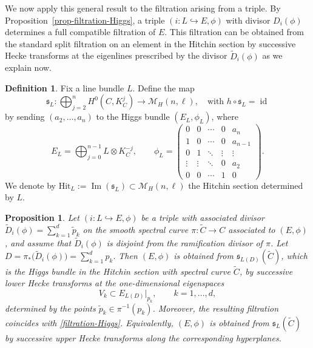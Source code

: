 \documentclass[twoside, 11pt]{article}
\numberwithin{equation}{section}
\theoremstyle{theorem}
\numberwithin{theorem}{section}
\newtheorem{proposition}[proposition]{Proposition}
\theoremstyle{definition}
\newtheorem{definition}[definition]{Definition}
\begin{document}
We now apply this general result to the filtration arising from a triple.
By Proposition~\ref{prop-filtration-Higgs}, a triple
\(
(i:L\hookrightarrow E,\phi)
\)
with divisor \(D_i(\phi)\) determines a full compatible filtration of \(E\).
This filtration can be obtained from the standard split
filtration on an element in the Hitchin section by successive Hecke transforms at the eigenlines
prescribed by the divisor \(\widetilde D_i(\phi)\) as we explain now.

\begin{definition}
Fix a line bundle \(L\). Define the map
\[
\mathfrak s_{L}:\bigoplus_{j=2}^n H^0(C,K_C^j)\longrightarrow \mathcal M_H(n,\ell), \quad \text{with }  h \circ \mathfrak s_{L}  =\operatorname{id}
\]
by sending \((a_2,\dots,a_n)\) to the Higgs bundle \((E_L,\phi_L)\), where
\[
E_L=\bigoplus_{j=0}^{n-1} L \otimes K_C^{-j},
\qquad
\phi_L=
\begin{pmatrix}
0 & 0 & \cdots & 0 & a_n\\
1 & 0 & \cdots & 0 & a_{n-1}\\
0 & 1 & \ddots & \vdots & \vdots\\
\vdots & \vdots & \ddots & 0 & a_2\\
0 & 0 & \cdots & 1 & 0
\end{pmatrix}.
\]
We denote by
\(
\mathrm{Hit}_L:=\operatorname{Im}(\mathfrak s_L)\subset \mathcal M_H(n,\ell)
\)
the Hitchin section determined by \(L\).
\end{definition}

\begin{proposition}\label{l:Hecke-triple-Hitchin}
Let \((i:L\hookrightarrow E,\phi)\) be a triple with associated divisor 
\(
\widetilde D_i(\phi)=\sum_{k=1}^d \widetilde p_k
\)
on the smooth spectral curve \(\pi:\widetilde C\to C\) associated to \((E,\phi)\), and assume that \(\widetilde D_i(\phi)\) is disjoint from the ramification divisor of \(\pi\). 
Let 
\(
D=\pi_\ast \bigl(\widetilde D_i(\phi)\bigr)=\sum_{k=1}^d p_k.
\)
Then \((E,\phi)\) is obtained from \(\mathfrak s_{L(D)}(\widetilde C)\), which is the Higgs bundle in the Hitchin section with spectral curve \(\widetilde C\), by successive lower Hecke transforms at the one-dimensional eigenspaces  
\[
V_k\subset E_{L(D)}|_{p_k},\qquad k=1,\dots,d,
\]
determined by the points \(\widetilde p_k\in \pi^{-1}(p_k)\). Moreover, the resulting filtration coincides with \eqref{filtration-Higgs}. Equivalently, \((E,\phi)\) is obtained from \(\mathfrak s_L(\widetilde C)\) by successive upper Hecke transforms along the corresponding hyperplanes.
\end{proposition}
\end{document}

